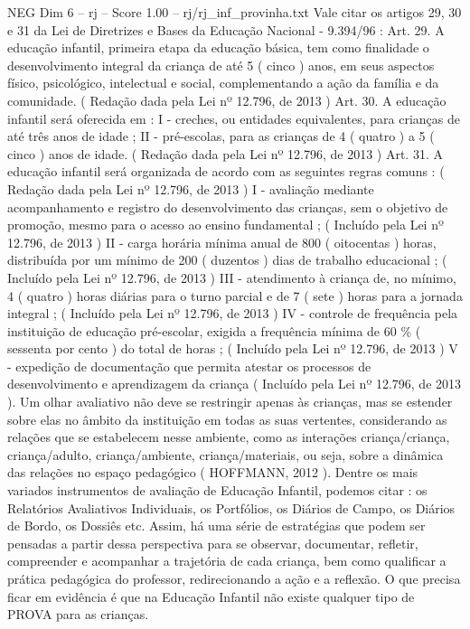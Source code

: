 \begin{textsample}{NEG Dim 6 – rj – Score 1.00 – rj/rj\_inf\_provinha.txt}
Vale citar os artigos 29, 30 e 31 da Lei de Diretrizes e Bases da Educação Nacional - 9.394/96 : Art. 29.
A educação infantil, primeira etapa da educação básica, tem como finalidade o desenvolvimento integral da criança de até 5 ( cinco ) anos, em seus aspectos físico, psicológico, intelectual e social, complementando a ação da família e da comunidade. ( Redação dada pela Lei nº 12.796, de 2013 ) Art. 30.
A educação infantil será oferecida em : I - creches, ou entidades equivalentes, para crianças de até três anos de idade ; II - pré-escolas, para as crianças de 4 ( quatro ) a 5 ( cinco ) anos de idade. ( Redação dada pela Lei nº 12.796, de 2013 ) Art. 31.
A educação infantil será organizada de acordo com as seguintes regras comuns : ( Redação dada pela Lei nº 12.796, de 2013 ) I - avaliação mediante acompanhamento e registro do desenvolvimento das crianças, sem o objetivo de promoção, mesmo para o acesso ao ensino fundamental ; ( Incluído pela Lei nº 12.796, de 2013 ) II - carga horária mínima anual de 800 ( oitocentas ) horas, distribuída por um mínimo de 200 ( duzentos ) dias de trabalho educacional ; ( Incluído pela Lei nº 12.796, de 2013 ) III - atendimento à criança de, no mínimo, 4 ( quatro ) horas diárias para o turno parcial e de 7 ( sete ) horas para a jornada integral ; ( Incluído pela Lei nº 12.796, de 2013 ) IV - controle de frequência pela instituição de educação pré-escolar, exigida a frequência mínima de 60 \% ( sessenta por cento ) do total de horas ; ( Incluído pela Lei nº 12.796, de 2013 ) V - expedição de documentação que permita atestar os processos de desenvolvimento e aprendizagem da criança ( Incluído pela Lei nº 12.796, de 2013 ).
Um olhar avaliativo não deve se restringir apenas às crianças, mas se estender sobre elas no âmbito da instituição em todas as suas vertentes, considerando as relações que se estabelecem nesse ambiente, como as interações criança/criança, criança/adulto, criança/ambiente, criança/materiais, ou seja, sobre a dinâmica das relações no espaço pedagógico ( HOFFMANN, 2012 ).
Dentre os mais variados instrumentos de avaliação de Educação Infantil, podemos citar : os Relatórios Avaliativos Individuais, os Portfólios, os Diários de Campo, os Diários de Bordo, os Dossiês etc.
Assim, há uma série de estratégias que podem ser pensadas a partir dessa perspectiva para se observar, documentar, refletir, compreender e acompanhar a trajetória de cada criança, bem como qualificar a prática pedagógica do professor, redirecionando a ação e a reflexão.
O que precisa ficar em evidência é que na Educação Infantil não existe qualquer tipo de PROVA para as crianças.

\end{textsample}
